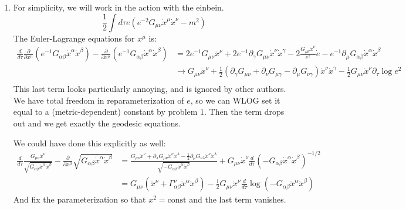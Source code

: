 \documentclass[11pt, class=article, crop=false]{standalone}
\begin{document}
\begin{enumerate}
		\item For simplicity, we will work in the action with the einbein.
		\[
			\frac12 \int d\tau e (e^{-2} G_{\mu \nu} \dot x^\mu \dot x^\nu - m^2) %
		\]
		The Euler-Lagrange equations for $x^\mu$ is:
		\begin{equation}
			\begin{aligned}
				\frac{d}{d\tau} \frac{\partial}{\partial x^\mu} (e^{-1} G_{\alpha \beta} \dot x^\alpha \dot x^\beta) - \frac{\partial}{\partial x^\mu}\left( e^{-1} G_{\alpha \beta} \dot x^\alpha \dot x^\beta \right)
				&= 2 e^{-1} G_{\mu \nu} \ddot x^\nu + 2 e^{-1} \partial_\gamma G_{\mu \nu} \dot x^\nu \dot x^\gamma - 2 \frac{G_{\mu \nu} \dot x^\nu}{e^2} \dot e  - e^{-1} \partial_\mu G_{\alpha \beta} \dot x^\alpha \dot x^\beta\\
				&\to G_{\mu \nu} \ddot x^\nu + \frac12 (\partial_\gamma G_{\mu \nu} + \partial_\nu G_{\mu \gamma} - \partial_\mu G_{\nu \gamma}) \dot x^\nu \dot x^\gamma - \frac12 G_{\mu \nu} \dot x^\nu \partial_\tau \log e^2 \\
			\end{aligned}
		\end{equation}
		This last term looks particularly annoying, and is ignored by other authors. We have total freedom in reparameterization of $e$, so we can WLOG set it equal to a (metric-dependent) constant by problem $1$. Then the term drops out and we get exactly the geodesic equations. 

		We could have done this explicitly as well: 
		\begin{equation}
			\begin{aligned}
				\frac{d}{d\tau} \frac{G_{\mu \nu} \dot x^\nu}{\sqrt{G_{\alpha \beta} \dot x^\alpha \dot x^\beta}} - \frac{\partial}{\partial x^\mu} \sqrt{G_{\alpha \beta} \dot x^\alpha \dot x^\beta} &= \frac{G_{\mu \nu} \ddot x^\nu + \partial_\lambda G_{\mu \nu} \dot x^\nu \dot x^\lambda - \frac12 \partial_\mu G_{\nu \lambda} \dot x^\nu \dot x^\lambda}{ \sqrt{-G_{\alpha \beta} \dot x^\alpha \dot x^\beta}} + G_{\mu \nu} \dot x^\nu \frac{d}{d\tau} (-G_{\alpha \beta} \dot x^\alpha \dot x^\beta)^{-1/2}\\
				&= G_{\mu \nu} (\ddot x^\nu + \Gamma^\nu_{\alpha \beta} \dot x^\alpha \dot x^\beta) - \frac12 G_{\mu \nu} \dot x^\nu \frac{d}{d\tau} \log(-G_{\alpha \beta} \dot x^\alpha \dot x^\beta)
			\end{aligned}
		\end{equation}
		And fix the parameterization so that $x^2 = \mathrm{const}$ and the last term vanishes.
		

\end{enumerate}
\end{document}
